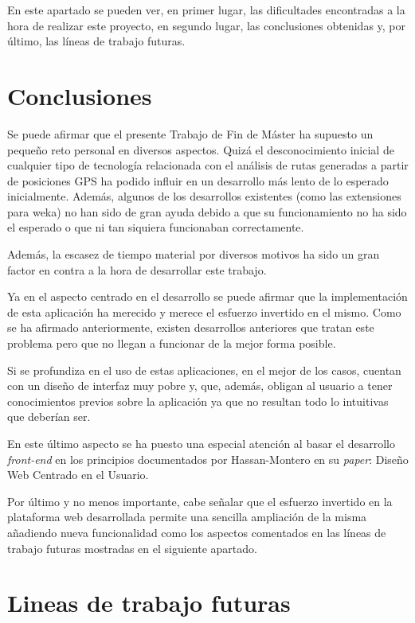 
En este apartado se pueden ver, en primer lugar, las dificultades encontradas a la hora de realizar
este proyecto, en segundo lugar, las conclusiones obtenidas y, por último, las líneas de trabajo
futuras.

\section{Conclusiones}

Se puede afirmar que el presente Trabajo de Fin de Máster ha supuesto un pequeño reto personal en diversos aspectos. Quizá el desconocimiento inicial de cualquier tipo de tecnología relacionada con el análisis de rutas generadas a partir de posiciones GPS ha podido influir en un desarrollo más lento de lo esperado inicialmente. Además, algunos de los desarrollos existentes (como las extensiones para weka) no han sido de gran ayuda debido a que su funcionamiento no ha sido el esperado o que ni tan siquiera funcionaban correctamente.

Además, la escasez de tiempo material por diversos motivos ha sido un gran factor en contra a la hora de desarrollar este trabajo.

Ya en el aspecto centrado en el desarrollo se puede afirmar que la implementación de esta aplicación ha merecido y merece el esfuerzo invertido en el mismo. Como se ha afirmado anteriormente, existen desarrollos anteriores que tratan este problema pero que no llegan a funcionar de la mejor forma posible.

Si se profundiza en el uso de estas aplicaciones, en el mejor de los casos, cuentan con un diseño de interfaz muy pobre y, que, además, obligan al usuario a tener conocimientos previos sobre la aplicación ya que no resultan todo lo intuitivas que deberían ser.

En este último aspecto se ha puesto una especial atención al basar el desarrollo \textit{front-end} en los principios documentados por Hassan-Montero en su \textit{paper}: Diseño Web Centrado en el Usuario.

Por último y no menos importante, cabe señalar que el esfuerzo invertido en la plataforma web desarrollada permite una sencilla ampliación de la misma añadiendo nueva funcionalidad como los aspectos comentados en las líneas de trabajo futuras mostradas en el siguiente apartado.

\section{Lineas de trabajo futuras}

